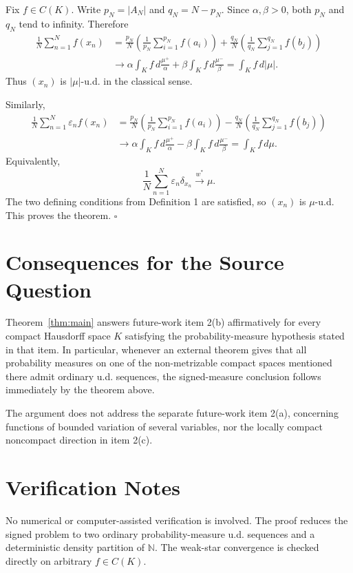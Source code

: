 \documentclass[11pt]{article}
\newcommand{\N}{\mathbb N}
\begin{document}
Fix \(f\in C(K)\).  Write \(p_N=|A_N|\) and \(q_N=N-p_N\).  Since
\(\alpha,\beta>0\), both \(p_N\) and \(q_N\) tend to infinity.  Therefore
\[
\begin{aligned}
 \frac{1}{N}\sum_{n=1}^N f(x_n)
 &= \frac{p_N}{N}\left(\frac{1}{p_N}\sum_{i=1}^{p_N}f(a_i)\right)
    +\frac{q_N}{N}\left(\frac{1}{q_N}\sum_{j=1}^{q_N}f(b_j)\right)\\
 &\longrightarrow
   \alpha\int_K f\,d\frac{\mu^+}{\alpha}
  +\beta\int_K f\,d\frac{\mu^-}{\beta}
  =\int_K f\,d|\mu|.
\end{aligned}
\]
Thus \((x_n)\) is \(|\mu|\)-u.d. in the classical sense.

Similarly,
\[
\begin{aligned}
 \frac{1}{N}\sum_{n=1}^N \varepsilon_n f(x_n)
 &= \frac{p_N}{N}\left(\frac{1}{p_N}\sum_{i=1}^{p_N}f(a_i)\right)
    -\frac{q_N}{N}\left(\frac{1}{q_N}\sum_{j=1}^{q_N}f(b_j)\right)\\
 &\longrightarrow
   \alpha\int_K f\,d\frac{\mu^+}{\alpha}
  -\beta\int_K f\,d\frac{\mu^-}{\beta}
  =\int_K f\,d\mu.
\end{aligned}
\]
Equivalently,
\[
   \frac{1}{N}\sum_{n=1}^N \varepsilon_n\delta_{x_n}
      \overset{w^*}{\longrightarrow}\mu .
\]
The two defining conditions from Definition 1 are satisfied, so
\((x_n)\) is \(\mu\)-u.d.  This proves the theorem. \(\square\)

\section*{Consequences for the Source Question}

Theorem~\ref{thm:main} answers future-work item 2(b) affirmatively for every
compact Hausdorff space \(K\) satisfying the probability-measure hypothesis
stated in that item.  In particular, whenever an external theorem gives that
all probability measures on one of the non-metrizable compact spaces mentioned
there admit ordinary u.d. sequences, the signed-measure conclusion follows
immediately by the theorem above.

The argument does not address the separate future-work item 2(a), concerning
functions of bounded variation of several variables, nor the locally compact
noncompact direction in item 2(c).

\section*{Verification Notes}

No numerical or computer-assisted verification is involved.  The proof reduces
the signed problem to two ordinary probability-measure u.d. sequences and a
deterministic density partition of \(\N\).  The weak-star convergence is
checked directly on arbitrary \(f\in C(K)\).
\end{document}
